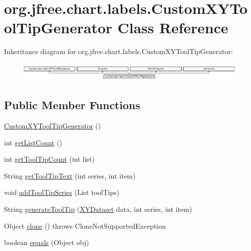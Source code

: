 \hypertarget{classorg_1_1jfree_1_1chart_1_1labels_1_1_custom_x_y_tool_tip_generator}{}\section{org.\+jfree.\+chart.\+labels.\+Custom\+X\+Y\+Tool\+Tip\+Generator Class Reference}
\label{classorg_1_1jfree_1_1chart_1_1labels_1_1_custom_x_y_tool_tip_generator}
Inheritance diagram for org.\+jfree.\+chart.\+labels.\+Custom\+X\+Y\+Tool\+Tip\+Generator\+:\begin{figure}[H]
\begin{center}
\leavevmode
\includegraphics[height=0.933333cm]{classorg_1_1jfree_1_1chart_1_1labels_1_1_custom_x_y_tool_tip_generator}
\end{center}
\end{figure}
\subsection*{Public Member Functions}
\begin{DoxyCompactItemize}
\item 
\mbox{\hyperlink{classorg_1_1jfree_1_1chart_1_1labels_1_1_custom_x_y_tool_tip_generator_a20c8932136837ebe68e2eb75556e61f1}{Custom\+X\+Y\+Tool\+Tip\+Generator}} ()
\item 
int \mbox{\hyperlink{classorg_1_1jfree_1_1chart_1_1labels_1_1_custom_x_y_tool_tip_generator_a377063f4d62b754322b4e324b1efe815}{get\+List\+Count}} ()
\item 
int \mbox{\hyperlink{classorg_1_1jfree_1_1chart_1_1labels_1_1_custom_x_y_tool_tip_generator_a35bb0a71d0a90af255ef5378246673cf}{get\+Tool\+Tip\+Count}} (int list)
\item 
String \mbox{\hyperlink{classorg_1_1jfree_1_1chart_1_1labels_1_1_custom_x_y_tool_tip_generator_aa12add02fc717cd599401eb5d9413eb8}{get\+Tool\+Tip\+Text}} (int series, int item)
\item 
void \mbox{\hyperlink{classorg_1_1jfree_1_1chart_1_1labels_1_1_custom_x_y_tool_tip_generator_a1497c4c7c989f057526f8b0dc9a5b211}{add\+Tool\+Tip\+Series}} (List tool\+Tips)
\item 
String \mbox{\hyperlink{classorg_1_1jfree_1_1chart_1_1labels_1_1_custom_x_y_tool_tip_generator_a40d4ed5ea25d06dcb879e6bd37b44bf9}{generate\+Tool\+Tip}} (\mbox{\hyperlink{interfaceorg_1_1jfree_1_1data_1_1xy_1_1_x_y_dataset}{X\+Y\+Dataset}} data, int series, int item)
\item 
Object \mbox{\hyperlink{classorg_1_1jfree_1_1chart_1_1labels_1_1_custom_x_y_tool_tip_generator_a986598b3ee670575238da07b5cd1f9da}{clone}} ()  throws Clone\+Not\+Supported\+Exception 
\item 
boolean \mbox{\hyperlink{classorg_1_1jfree_1_1chart_1_1labels_1_1_custom_x_y_tool_tip_generator_a864822e9155e7c9aba85e9f4ec305570}{equals}} (Object obj)
\end{DoxyCompactItemize}


